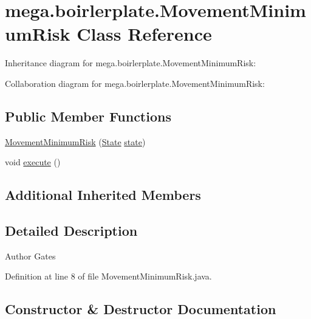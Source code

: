 \hypertarget{classmega_1_1boirlerplate_1_1_movement_minimum_risk}{}\section{mega.\+boirlerplate.\+Movement\+Minimum\+Risk Class Reference}
\label{classmega_1_1boirlerplate_1_1_movement_minimum_risk}


Inheritance diagram for mega.\+boirlerplate.\+Movement\+Minimum\+Risk\+:


Collaboration diagram for mega.\+boirlerplate.\+Movement\+Minimum\+Risk\+:
\subsection*{Public Member Functions}
\begin{DoxyCompactItemize}
\item 
\hyperlink{classmega_1_1boirlerplate_1_1_movement_minimum_risk_a3121206701e67a85e10577371f30a399}{Movement\+Minimum\+Risk} (\hyperlink{classmega_1_1boirlerplate_1_1_state}{State} \hyperlink{classmega_1_1boirlerplate_1_1_component_a87b0d70f323b5fee60a200e07c9c20fd}{state})
\item 
void \hyperlink{classmega_1_1boirlerplate_1_1_movement_minimum_risk_ab501a9f3690d8ff73ed25fb05374c83f}{execute} ()
\end{DoxyCompactItemize}
\subsection*{Additional Inherited Members}


\subsection{Detailed Description}
\begin{DoxyAuthor}{Author}
Gates 
\end{DoxyAuthor}


Definition at line 8 of file Movement\+Minimum\+Risk.\+java.



\subsection{Constructor \& Destructor Documentation}
\mbox{\label{classmega_1_1boirlerplate_1_1_movement_minimum_risk_a3121206701e67a85e10577371f30a399}} 
